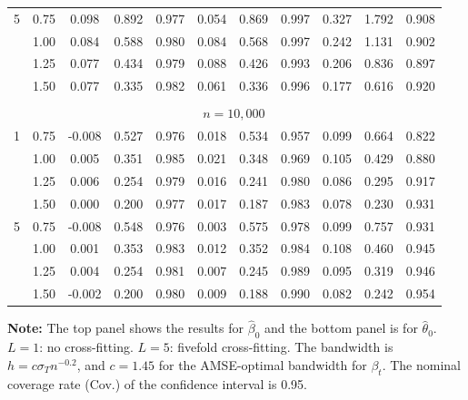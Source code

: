 \documentclass[lettersize, 12pt]{article}
\begin{document}
{\begin{table}
\begin{center}
\begin{tabular*}{0.9\textwidth}{@{}cc|ccc|ccc|ccc@{}}
          5       & 0.75  & 0.098 & 0.892 & 0.977 & 0.054 & 0.869 & 0.997 &	0.327	&	1.792	&	0.908\\
                 & 1.00  & 0.084 & 0.588 & 0.980 & 0.084 & 0.568 & 0.997 &	0.242	&	1.131	&	0.902\\
                 & 1.25  & 0.077 & 0.434 & 0.979 & 0.088 & 0.426 & 0.993 &	0.206	&	0.836	&	0.897\\
                 & 1.50  & 0.077 & 0.335 & 0.982 & 0.061 & 0.336 & 0.996 &	0.177	&	0.616	&	0.920\\
              \hline\\[-14pt]
  &  \multicolumn{10}{c}{$n=10,000$} \\[2pt]    %
          1     & 0.75  & -0.008 & 0.527 & 0.976 & 0.018 & 0.534 & 0.957&	0.099	&	0.664	&	0.822 \\
                 & 1.00  & 0.005 & 0.351 & 0.985 & 0.021 & 0.348 & 0.969 &	0.105	&	0.429	&	0.880\\
                 & 1.25  & 0.006 & 0.254 & 0.979 & 0.016 & 0.241 & 0.980&	0.086	&	0.295	&	0.917 \\
                 & 1.50  & 0.000 & 0.200 & 0.977 & 0.017 & 0.187 & 0.983 &	0.078	&	0.230	&	0.931\\\hline
          5     & 0.75  & -0.008 & 0.548 & 0.976 & 0.003 & 0.575 & 0.978&	0.099	&	0.757	&	0.931 \\
                 & 1.00  & 0.001 & 0.353 & 0.983 & 0.012 & 0.352 & 0.984 &	0.108	&	0.460	&	0.945\\
                 & 1.25  & 0.004 & 0.254 & 0.981 & 0.007 & 0.245 & 0.989 &	0.095	&	0.319	&	0.946\\
                 & 1.50  & -0.002 & 0.200 & 0.980 & 0.009 & 0.188 & 0.990 &	0.082	&	0.242	&	0.954\\
\hline
\hline 
   \end{tabular*}%
       \end{center}
       \footnotesize
       \renewcommand{\baselineskip}{11pt}
       \textbf{Note:} 
       The top panel shows the results for $\hat\beta_0$ and the bottom panel is for $\hat\theta_0$.
       $L=1$: no cross-fitting.  $L=5$: fivefold cross-fitting. 
The bandwidth is $h = c \sigma_T n^{-0.2}$, and $c = 1.45$ for the AMSE-optimal bandwidth for $\beta_t$.  
      The nominal coverage rate (Cov.) of the confidence interval is 0.95.
       \end{table}
}
\end{document}
